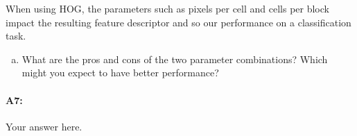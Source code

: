 When using HOG, the parameters such as pixels per cell and cells per block impact the resulting feature descriptor and so our performance on a classification task.
\begin{enumerate}[(b)]
\item What are the pros and cons of the two parameter combinations? Which might you expect to have better performance?
\end{enumerate}

\pagebreak
\paragraph{A7:} Your answer here.








% 






